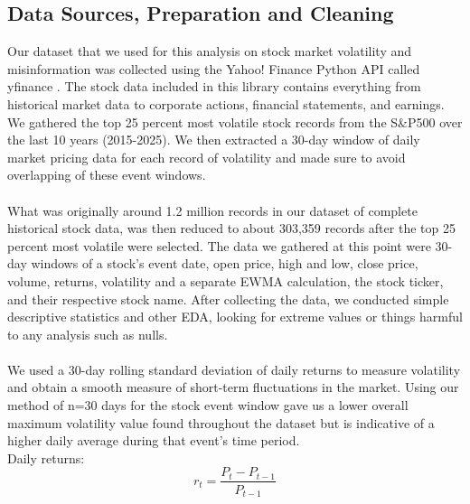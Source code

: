 \documentclass{article}
\begin{document}
\subsection{Data Sources, Preparation and Cleaning}
Our dataset that we used for this analysis on stock market volatility and misinformation was collected using the Yahoo! Finance Python API called yfinance \cite{yahoofinance2025}. The stock data included in this library contains everything from historical market data to corporate actions, financial statements, and earnings. We gathered the top 25 percent most volatile stock records from the S\&P500 over the last 10 years (2015-2025). We then extracted a 30-day window of daily market pricing data for each record of volatility and made sure to avoid overlapping of these event windows.
\\\\
What was originally around 1.2 million records in our dataset of complete historical stock data, was then reduced to about 303,359 records after the top 25 percent most volatile were selected. The data we gathered at this point were 30-day windows of a stock’s event date, open price, high and low, close price, volume, returns, volatility and a separate EWMA calculation, the stock ticker, and their respective stock name. After collecting the data, we conducted simple descriptive statistics and other EDA, looking for extreme values or things harmful to any analysis such as nulls.
\\\\
We used a 30-day rolling standard deviation of daily returns to measure volatility and obtain a smooth measure of short-term fluctuations in the market. Using our method of n=30 days for the stock event window gave us a lower overall maximum volatility value found throughout the dataset but is indicative of a higher daily average during that event’s time period. \\

Daily returns:
\[
r_t = \frac{P_t - P_{t-1}}{P_{t-1}}
\]
\\
\end{document}
